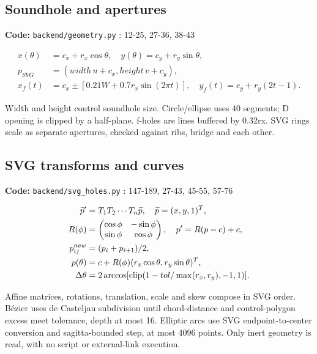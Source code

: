 \documentclass[10pt,a4paper]{article}
\newcommand{\loc}[1]{{\small\color{ink}\textbf{Code:} #1\par}}
\begin{document}
\begin{samepage}\subsection{Soundhole and apertures}
\loc{\texttt{backend/geometry.py} : 12-25, 27-36, 38-43}
\begin{align}x(\theta)&=c_x+r_x\cos\theta,\quad y(\theta)=c_y+r_y\sin\theta,\\
p_{SVG}&=(width\,u+c_x,height\,v+c_y),\\
x_f(t)&=c_x\pm[0.21W+0.7r_x\sin(2\pi t)],\quad y_f(t)=c_y+r_y(2t-1).\end{align}

Width and height control soundhole size. Circle/ellipse uses 40 segments; D opening is clipped by a half-plane. f-holes are lines buffered by 0.32rx. SVG rings scale as separate apertures, checked against ribs, bridge and each other.\par
\end{samepage}
\begin{samepage}\subsection{SVG transforms and curves}
\loc{\texttt{backend/svg\_holes.py} : 147-189, 27-43, 45-55, 57-76}
\begin{align}\widetilde p'&=T_1T_2\cdots T_n\widetilde p,\quad\widetilde p=(x,y,1)^T,\\
R(\phi)&=\begin{pmatrix}\cos\phi&-\sin\phi\\\sin\phi&\cos\phi\end{pmatrix},\quad p'=R(p-c)+c,\\
p_{ij}^{new}&=(p_i+p_{i+1})/2,\\
p(\theta)&=c+R(\phi)(r_x\cos\theta,r_y\sin\theta)^T,\\
\Delta\theta&=2\arccos[\operatorname{clip}(1-tol/\max(r_x,r_y),-1,1)].\end{align}

Affine matrices, rotations, translation, scale and skew compose in SVG order. Bézier uses de Casteljau subdivision until chord-distance and control-polygon excess meet tolerance, depth at most 16. Elliptic arcs use SVG endpoint-to-center conversion and sagitta-bounded step, at most 4096 points. Only inert geometry is read, with no script or external-link execution.\par
\end{samepage}
\end{document}
